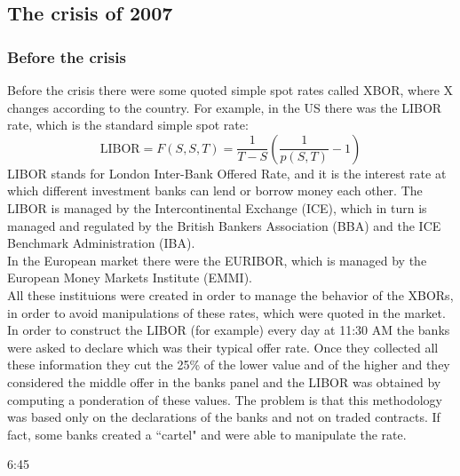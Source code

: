 \subsection{The crisis of 2007}
\subsubsection{Before the crisis}
Before the crisis there were some quoted simple spot rates called XBOR, where X changes according to the country. For example, in the US there was the LIBOR rate, which is the standard simple spot rate:
\begin{equation}
    \text{LIBOR} = F(S,S,T) = \frac{1}{T-S}\left(\frac{1}{p(S,T)}-1\right)
\end{equation}
LIBOR stands for London Inter-Bank Offered Rate, and it is the interest rate at which different investment banks can lend or borrow money each other. The LIBOR is managed by the Intercontinental Exchange (ICE), which in turn is managed and regulated by the British Bankers Association (BBA) and the ICE Benchmark Administration (IBA).\\
In the European market there were the EURIBOR, which is managed by the European Money Markets Institute (EMMI).\\
All these instituions were created in order to manage the behavior of the XBORs, in order to avoid manipulations of these rates, which were quoted in the market. In order to construct the LIBOR (for example) every day at 11:30 AM the banks were asked to declare which was their typical offer rate. Once they collected all these information they cut the 25\% of the lower value and of the higher and they considered the middle offer in the banks panel and the LIBOR was obtained by computing a ponderation of these values. The problem is that this methodology was based only on the declarations of the banks and not on traded contracts. If fact, some banks created a ``cartel" and were able to manipulate the rate.

6:45 
